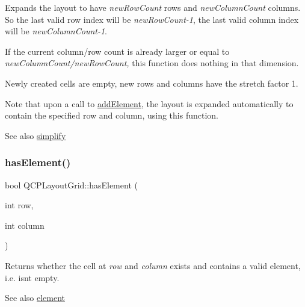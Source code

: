Expands the layout to have {\itshape new\+Row\+Count} rows and {\itshape new\+Column\+Count} columns. So the last valid row index will be {\itshape new\+Row\+Count-\/1}, the last valid column index will be {\itshape new\+Column\+Count-\/1}.

If the current column/row count is already larger or equal to {\itshape new\+Column\+Count/{\itshape new\+Row\+Count},} this function does nothing in that dimension.

Newly created cells are empty, new rows and columns have the stretch factor 1.

Note that upon a call to \hyperlink{class_q_c_p_layout_grid_adff1a2ca691ed83d2d24a4cd1fe17012}{add\+Element}, the layout is expanded automatically to contain the specified row and column, using this function.

\begin{DoxySeeAlso}{See also}
\hyperlink{class_q_c_p_layout_grid_a08bba60e4acd20165526a8fd7f986b58}{simplify} 
\end{DoxySeeAlso}
\hypertarget{class_q_c_p_layout_grid_ab0cf4f7edc9414a3bfaddac0f46dc0a0}{}\label{class_q_c_p_layout_grid_ab0cf4f7edc9414a3bfaddac0f46dc0a0} 
\subsubsection{\texorpdfstring{has\+Element()}{hasElement()}}
{\footnotesize\ttfamily bool Q\+C\+P\+Layout\+Grid\+::has\+Element (\begin{DoxyParamCaption}\item[{int}]{row,  }\item[{int}]{column }\end{DoxyParamCaption})}

Returns whether the cell at {\itshape row} and {\itshape column} exists and contains a valid element, i.\+e. isn\textquotesingle{}t empty.

\begin{DoxySeeAlso}{See also}
\hyperlink{class_q_c_p_layout_grid_a602b426609b4411cf6a93c3ddf3a381a}{element} 
\end{DoxySeeAlso}
\hypertarget{class_q_c_p_layout_grid_a1e880a321dbe8b43b471ccd764433dc4}{}\label{class_q_c_p_layout_grid_a1e880a321dbe8b43b471ccd764433dc4} 
